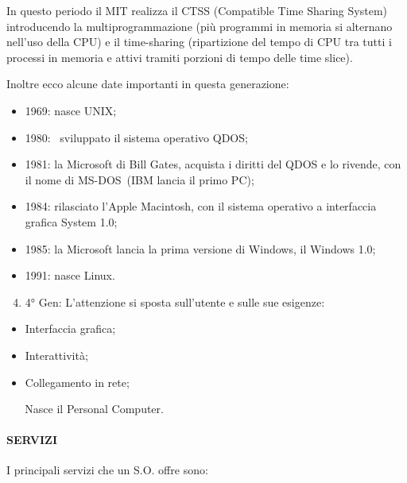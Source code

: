 \documentclass[
]{article}
\providecommand{\tightlist}{%
  \setlength{\itemsep}{0pt}\setlength{\parskip}{0pt}}
\begin{document}
{In questo periodo il MIT realizza il CTSS (Compatible Time Sharing
System) introducendo la multiprogrammazione (più programmi in memoria si
alternano nell'uso della CPU) e il time-sharing (ripartizione del tempo
di CPU tra tutti i processi in memoria e attivi tramiti porzioni di
tempo delle time slice). }

{}

{Inoltre ecco alcune date importanti in questa generazione:}

\begin{itemize}
\tightlist
\item
  {1969}{: nasce }{UNIX}{;}
\item
  {1980}{: ~sviluppato il sistema operativo }{QDOS}{;}
\item
  {1981}{: la Microsoft di Bill Gates, acquista i diritti del QDOS e lo
  rivende, con il nome di }{MS-DOS}{~(}{IBM lancia il primo PC}{);}
\item
  {1984}{: rilasciato l'}{Apple Macintosh}{, con il sistema operativo a
  interfaccia grafica }{System 1.0;}
\item
  {1985}{: la Microsoft lancia la prima versione di Windows, il
  }{Windows 1.0}{;}
\item
  {1991}{: nasce }{Linux}{.}
\end{itemize}

{}

\begin{enumerate}
\setcounter{enumi}{3}
\tightlist
\item
  {4° Gen}{: L'attenzione si sposta sull'utente e sulle sue esigenze:}
\end{enumerate}

\begin{itemize}
\tightlist
\item
  {Interfaccia grafica;}
\item
  {Interattività;}
\item
  {Collegamento in rete;}
\end{itemize}

{~ ~ Nasce il Personal Computer.}

{}

\paragraph{\texorpdfstring{{SERVIZI}}{SERVIZI}}\label{h.awli49g8b7vn}

{I principali servizi che un S.O. offre sono:}

{}
\end{document}
